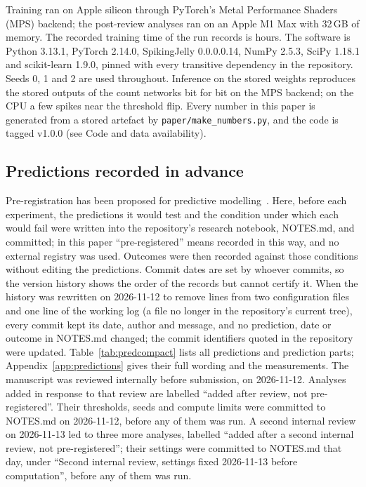 \documentclass[10pt]{article}
\begin{document}
Training ran on Apple silicon through PyTorch's Metal Performance Shaders (MPS) backend; the post-review analyses ran on an
Apple M1 Max with 32\,GB of memory. The recorded training time of the \trainRecords{} run %
records is \trainHoursAll{} hours. The software is Python 3.13.1, PyTorch 2.14.0, SpikingJelly %
0.0.0.0.14, NumPy 2.5.3, SciPy 1.18.1 and scikit-learn 1.9.0, pinned with every transitive
dependency in the repository. Seeds 0, 1 and 2 are used throughout. Inference on the stored
weights reproduces the stored outputs of the count networks bit for bit on the MPS backend; on the CPU a few spikes
near the threshold flip. Every number in this paper is generated from a stored artefact by
\texttt{paper/make\_numbers.py}, and the code is tagged v1.0.0 (see Code and data availability).

\subsection{Predictions recorded in advance}
\label{sec:prereg}

Pre-registration has been proposed for predictive modelling~\citep{hofman2023preregistration}. %
Here, before each experiment, the predictions it would test and the condition under which each
would fail were written into the repository's research notebook, NOTES.md, and committed; in this
paper ``pre-registered'' means recorded in this way, and no external registry was used. Outcomes
were then recorded against those conditions without editing the predictions. Commit dates are set by whoever commits, so the version history shows the order of the
records but cannot certify it. When the history was rewritten on 2026-11-12 to remove lines from
two configuration files and one line of the working log (a file no longer in the repository's
current tree), every commit kept its date, author and message, and no prediction, date
or outcome in NOTES.md changed; the commit identifiers quoted in the repository were updated.
Table~\ref{tab:predcompact} lists all \predictionsEverything{} predictions and prediction parts; %
Appendix~\ref{app:predictions} gives their full wording and the measurements. The manuscript was
reviewed internally before submission, on 2026-11-12. Analyses added in response to that review
are labelled ``added after review, not pre-registered''. Their thresholds, seeds and compute
limits were committed to NOTES.md on 2026-11-12, before any of them was run. A second internal
review on 2026-11-13 led to three more analyses, labelled ``added after a second internal review,
not pre-registered''; their settings were committed to NOTES.md that day, under ``Second internal
review, settings fixed 2026-11-13 before computation'', before any of them was run.
\end{document}
